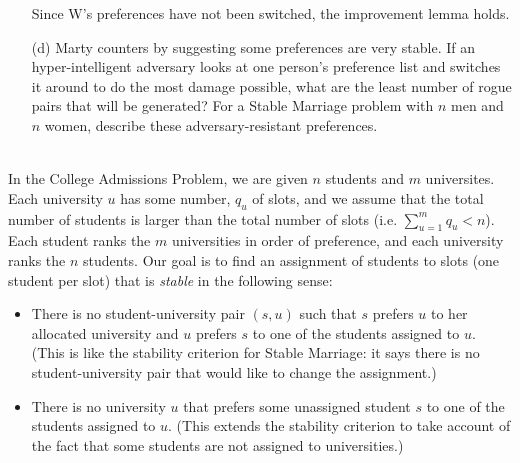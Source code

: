 \documentclass[11pt]{article}
\newif\ifsolutions
\begin{document}
\begin{qunlist}
\begin{itemize}
Since W's preferences have not been switched, the improvement lemma holds.
\fi


\item[(d)] Marty counters by suggesting some preferences are very stable. 
If an hyper-intelligent adversary looks at one person's preference list and switches it around to do the most damage possible, 
what are the least number of rogue pairs that will be generated? 
For a Stable Marriage problem with $n$ men and $n$ women, describe these adversary-resistant preferences.

\ifsolutions
\textbf{Solutions:} It's possible this can generate 0 rogue couples. 
In order for this to happen, create a pair of men and women such that each pair ranks the other person number one on their preference list. 
We argue that if a man and a woman rank each other number 1, they must be paired together in all stable pairings. 
Assume for contradiction that M and W who rank each other number 1 are paired with other people (M,W*) and (M*,W). 
If this is the case, (M,W) would be a rogue couple because they are both each other's top preference. 
When the adversary disrupts the preference list of one person, 
we just proved that the other $n-1$ men and $n-1$ women must be paired with their number 1 partner. 
There is only one way to pair the remaining man and woman (one of whose list is corrupted) together. 
Therefore there are no rogue couples!
\fi


\end{itemize}




\\
In the College Admissions Problem, we are given $n$ students and $m$ universites. 
Each university $u$ has some number, $q_u$ of slots, 
and we assume that the total number of students is larger than the total number of slots
(i.e. $\sum_{u=1}^m{q_u} < n$). 
Each student ranks the $m$ universities in order of preference, and each university ranks the $n$ students. 
Our goal is to find an assignment of students to slots (one student per slot) that is \textit{stable} 
in the following sense:
\begin{itemize}
\item There is no student-university pair $(s,u)$ such that $s$ prefers $u$ to her allocated university 
and $u$ prefers $s$ to one of the students assigned to $u$. 
(This is like the stability criterion for Stable Marriage: 
it says there is no student-university pair that would like to change the assignment.)
\item There is no university $u$ that prefers some unassigned student $s$ to one of the students assigned to $u$.
(This extends the stability criterion to take account of the fact that 
some students are not assigned to universities.)
\end{itemize}


\end{qunlist}
\end{document}
